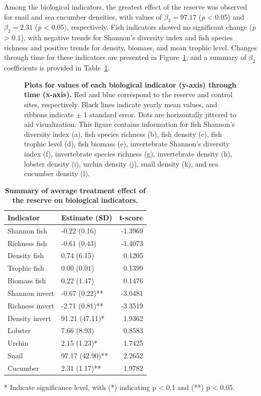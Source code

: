 \documentclass[10pt,letterpaper]{article}
\begin{document}
Among the biological indicators, the greatest effect of the reserve was observed for snail and sea cucumber densities, with values of \(\beta_2 = 97.17\) (\emph{p} \textless{} 0.05) and \(\beta_2 = 2.31\) (\emph{p} \textless{} 0.05), respectively. Fish indicators showed no significant change (\emph{p} \textgreater{} 0.1), with negative trends for Shannon's diversity index and fish species richness and positive trends for density, biomass, and mean trophic level. Changes through time for these indicators are presented in Figure~\ref{fig5}, and a summary of \(\beta_2\) coefficients is provided in Table~\ref{table3}.

\begin{figure}[!h]
\caption{{\bf Plots for values of each biological indicator (y-axis) through time (x-axis).}
Red and blue correspond to the reserve and control sites, respectively. Black lines indicate yearly mean values, and ribbons indicate \(\pm\) 1 standard error. Dots are horizontally jittered to aid visualization. This figure contains information for fish Shannon's diversity index (a), fish species richness (b), fish density (c), fish trophic level (d), fish biomass (e), invertebrate Shannon's diversity index (f), invertebrate species richness (g), invertebrate density (h), lobster density (i), urchin density (j), snail density (k), and sea cucumber density (l).}
\label{fig5}
\end{figure}

\begin{table}[!ht]
\centering
\caption{
{\bf Summary of average treatment effect of the reserve on biological indicators.}}
\begin{tabular}{l|l|r}
\hline
\bfseries{Indicator} & \bfseries{Estimate (SD)} & \bfseries{t-score}\\
\hline
Shannon fish & -0.22 (0.16) & -1.3969\\
\hline
Richness fish & -0.61 (0.43) & -1.4073\\
\hline
Density fish & 0.74 (6.15) & 0.1205\\
\hline
Trophic fish & 0.00 (0.01) & 0.1399\\
\hline
Biomass fish & 0.22 (1.47) & 0.1476\\
\hline
Shannon invert & -0.67 (0.22)** & -3.0481\\
\hline
Richness invert & -2.71 (0.81)** & -3.3519\\
\hline
Density invert & 91.21 (47.11)* & 1.9362\\
\hline
Lobster & 7.66 (8.93) & 0.8583\\
\hline
Urchin & 2.15 (1.23)* & 1.7425\\
\hline
Snail & 97.17 (42.90)** & 2.2652\\
\hline
Cucumber & 2.31 (1.17)** & 1.9782\\
\hline
\end{tabular}
\begin{flushleft} * Indicate significance level, with (*) indicating p \textless{} 0.1 and (**) p \textless{} 0.05.
\end{flushleft}
\label{table3}
\end{table}
\end{document}
